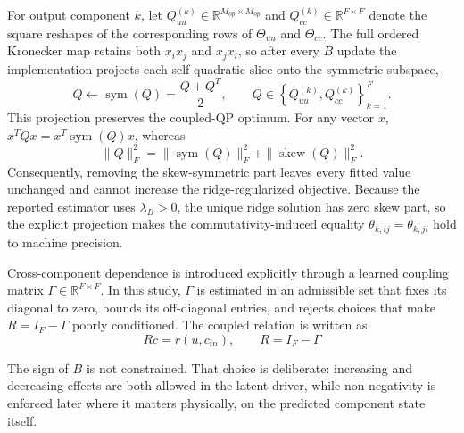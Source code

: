 \documentclass[a4paper,fleqn]{cas-sc}
\newenvironment{currentrevblock}{\begingroup\color{currentRevisionBlue}}{\endgroup}
\newenvironment{currentrevblock}{}{}
\newenvironment{revblock}{}{}
\begin{document}
\begin{revblock}
\begin{currentrevblock}
For output component $k$, let $Q_{uu}^{(k)} \in \mathbb{R}^{M_{op} \times M_{op}}$ and $Q_{cc}^{(k)} \in \mathbb{R}^{F \times F}$ denote the square reshapes of the corresponding rows of $\Theta_{uu}$ and $\Theta_{cc}$. The full ordered Kronecker map retains both $x_i x_j$ and $x_j x_i$, so after every $B$ update the implementation projects each self-quadratic slice onto the symmetric subspace,
\begin{equation*}
Q \leftarrow \operatorname{sym}(Q) = \frac{Q + Q^T}{2},
\qquad Q \in \left\{Q_{uu}^{(k)},Q_{cc}^{(k)}\right\}_{k=1}^{F}.
\end{equation*}
This projection preserves the coupled-QP optimum. For any vector $x$, $x^TQx=x^T\operatorname{sym}(Q)x$, whereas
\begin{equation*}
\|Q\|_F^2 = \|\operatorname{sym}(Q)\|_F^2 + \|\operatorname{skew}(Q)\|_F^2.
\end{equation*}
Consequently, removing the skew-symmetric part leaves every fitted value unchanged and cannot increase the ridge-regularized objective. Because the reported estimator uses $\lambda_B>0$, the unique ridge solution has zero skew part, so the explicit projection makes the commutativity-induced equality $\theta_{k,ij}=\theta_{k,ji}$ hold to machine precision.
\end{currentrevblock}

Cross-component dependence is introduced explicitly through a learned coupling matrix $\Gamma \in \mathbb{R}^{F \times F}$. In this study, $\Gamma$ is estimated in an admissible set that fixes its diagonal to zero, bounds its off-diagonal entries, and rejects choices that make $R = I_F - \Gamma$ poorly conditioned. The coupled relation is written as
\begin{equation}
\label{eq:coupled-relation}
 R c = r(u, c_{in}), \qquad R = I_F - \Gamma
\end{equation}

The sign of $B$ is not constrained. That choice is deliberate: increasing and decreasing effects are both allowed in the latent driver, while non-negativity is enforced later where it matters physically, on the predicted component state itself.


\end{revblock}
\end{document}
